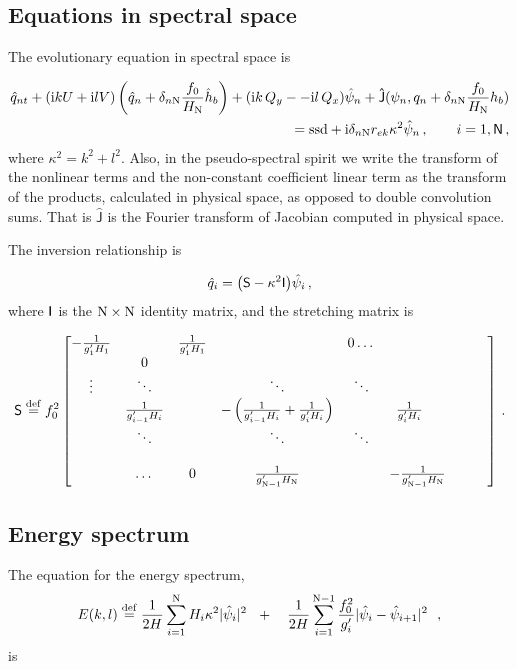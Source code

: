 \documentclass[11pt]{article}
\newcommand{\ssd}{\text{ssd}}
\newcommand{\sS}{\mathsf{S}}
\begin{document}
\subsection*{Equations in spectral space}

The evolutionary equation in spectral space is

\begin{align}
    \hat{q}_{nt} + (\mathrm{i} k U + \mathrm{i} l V) \left(\hat{q}_n + \delta_{n \nmax} \frac{f_0}{H_\nmax}\hat{h}_b\right) + (\mathrm{i} k\, {Q_y} -  - \mathrm{i} l\,{Q_x}){\hat{\psi}_n} + \mathsf{\hat{J}}(\psi_n, q_n + \delta_{n \nmax} \frac{f_0}{H_\nmax}h_b )   \nonumber \\ =  \ssd + \mathrm{i}  \delta_{n \nmax} r_{ek} \kappa^2 \hat{\psi}_n \,, \qquad i = 1,\textsf{N}\com
\end{align}
where $\kappa^2 = k^2 + l^2$. Also, in the pseudo-spectral spirit we write the transform of the nonlinear
terms and the non-constant coefficient linear term as the transform of the products, calculated in physical space, as opposed to double convolution sums.  That is $\mathsf{\hat{J}}$ is the Fourier transform of Jacobian computed in physical space.

The inversion relationship is

\begin{equation}
    \hat{q}_i = {\left(\sS - \kappa^2 \sI \right)} \hat{\psi}_i\com
\end{equation}
where $\mathsf{I}$ is the $\mathrm{N}\times\mathrm{N}$ identity matrix, and the stretching matrix is

\begin{equation}
\textsf{S} \stackrel{\mathrm{def}}{=}  f_0^2
\begin{bmatrix}
    -\frac{1}{g'_1 H_1}& & \frac{1}{g'_1 H_1} &  & 0 \dots& \\
 & 0 & & & & &\\
    \vdots & \ddots& &\ddots &\ddots & & & &\\
       & \frac{1}{g'_{i-1} H_i}& &  -\left(\frac{1}{g'_{i-1} H_i} + \frac{1}{g'_{i} H_i}\right)& & \frac{1}{g'_{i} H_i}\,\,\,\,\,\,\, \\
       & \ddots& & \ddots &\ddots & & & &\\
& & & & & \\
& \dots & 0 & \frac{1}{ g'_{\mathrm{N}-1} H_{\mathrm{N}}}& & -\frac{1}{g'_{\mathrm{N}-1} H_{\mathrm{N}}}
\end{bmatrix}
\, .
\end{equation}

\subsection*{Energy spectrum}
The equation for the energy spectrum,
\begin{equation}
E(k,l) \stackrel{\mathrm{def}}{=} {\frac{1}{2 H}\sum_{i=1}^{\mathrm{N}} H_i \kappa^2 |\hat{\psi}_i|^2} \,\,\,\,+ \,\,\,\,\,\, {\frac{1}{2 H} \sum_{i=1}^{\mathrm{N}-1} \frac{f_0^2}{g'_i}|\hat{\psi}_{i}- \hat{\psi}_{i+1}|^2}\,\,\,\,,
\end{equation}
is 
\end{document}
